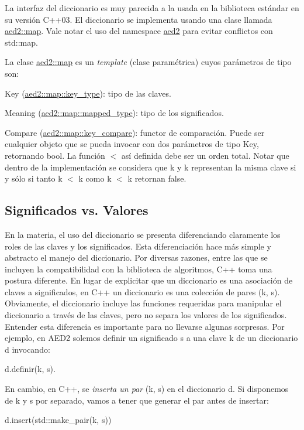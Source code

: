 La interfaz del diccionario es muy parecida a la usada en la biblioteca estándar en su versión C++03. El diccionario se implementa usando una clase llamada \hyperlink{classaed2_1_1map}{aed2\+::map}. Vale notar el uso del namespace \hyperlink{namespaceaed2}{aed2} para evitar conflictos con std\+::map.

La clase \hyperlink{classaed2_1_1map}{aed2\+::map} es un {\itshape template} (clase paramétrica) cuyos parámetros de tipo son\+:
\begin{DoxyItemize}
\item Key (\hyperlink{classaed2_1_1map_a4273e8812e7105a618df58a2c8b72b7d_a4273e8812e7105a618df58a2c8b72b7d}{aed2\+::map\+::key\+\_\+type})\+: tipo de las claves.
\item Meaning (\hyperlink{classaed2_1_1map_aa3e34bf624f3009884a71b18f4ddae40_aa3e34bf624f3009884a71b18f4ddae40}{aed2\+::map\+::mapped\+\_\+type})\+: tipo de los significados.
\item Compare (\hyperlink{classaed2_1_1map_a3efa081d3379ab76f33a5ef9fe697523_a3efa081d3379ab76f33a5ef9fe697523}{aed2\+::map\+::key\+\_\+compare})\+: functor de comparación. Puede ser cualquier objeto que se pueda invocar con dos parámetros de tipo Key, retornando {\ttfamily bool}. La función $<$ así definida debe ser un orden total. Notar que dentro de la implementación se considera que {\ttfamily k} y {\ttfamily k\textquotesingle{}} representan la misma clave si y sólo si tanto {\ttfamily k} $<$ {\ttfamily k\textquotesingle{}} como {\ttfamily k\textquotesingle{}} $<$ {\ttfamily k} retornan {\ttfamily false}.
\end{DoxyItemize}\hypertarget{Interfaz_Diferencias}{}\subsection{Significados vs. Valores}\label{Interfaz_Diferencias}
En la materia, el uso del diccionario se presenta diferenciando claramente los roles de las claves y los significados. Esta diferenciación hace más simple y abstracto el manejo del diccionario. Por diversas razones, entre las que se incluyen la compatibilidad con la biblioteca de algoritmos, C++ toma una postura diferente. En lugar de explicitar que un diccionario es una asociación de claves a significados, en C++ un diccionario es una colección de pares {\ttfamily (k, s)}. Obviamente, el diccionario incluye las funciones requeridas para manipular el diccionario a través de las claves, pero no separa los valores de los significados. Entender esta diferencia es importante para no llevarse algunas sorpresas. Por ejemplo, en A\+E\+D2 solemos definir un significado {\ttfamily s} a una clave {\ttfamily k} de un diccionario {\ttfamily d} invocando\+: 
\begin{DoxyCode}
d.definir(k, s).
\end{DoxyCode}
 En cambio, en C++, se {\itshape inserta un par} {\ttfamily (k, s)} en el diccionario {\ttfamily d}. Si disponemos de {\ttfamily k} y {\ttfamily s} por separado, vamos a tener que generar el par antes de insertar\+: 
\begin{DoxyCode}
d.insert(std::make\_pair(k, s))
\end{DoxyCode}


